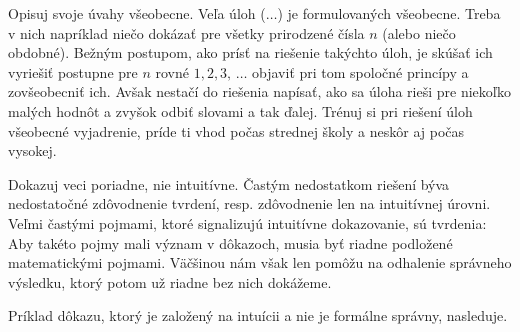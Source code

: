 {Opisuj svoje úvahy všeobecne. Veľa úloh ($\ldots$) je formulovaných všeobecne. Treba v nich napríklad niečo dokázať pre všetky prirodzené čísla $n$ (alebo niečo obdobné). Bežným postupom, ako prísť na riešenie takýchto úloh, je skúšať ich vyriešiť postupne pre $n$ rovné $1, 2, 3,\,\ldots$ objaviť pri tom spoločné princípy a zovšeobecniť ich. Avšak nestačí do riešenia napísať, ako sa úloha rieši pre niekoľko malých hodnôt a zvyšok odbiť slovami a tak ďalej. Trénuj si pri riešení úloh všeobecné vyjadrenie, príde ti vhod počas strednej školy a neskôr aj počas vysokej.

Dokazuj veci poriadne, nie intuitívne. Častým nedostatkom riešení býva nedostatočné zdôvodnenie tvrdení, resp. zdôvodnenie len na intuitívnej úrovni. Veľmi častými pojmami, ktoré signalizujú intuitívne dokazovanie, sú tvrdenia:    Aby takéto pojmy mali význam v dôkazoch, musia byť riadne podložené matematickými pojmami. Väčšinou nám však len pomôžu na odhalenie správneho výsledku, ktorý potom už riadne bez nich dokážeme.

Príklad dôkazu, ktorý je založený na intuícii a nie je formálne správny, nasleduje.\\
\\}
